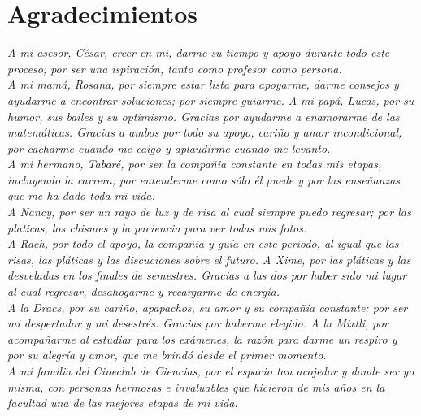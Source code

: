 \chapter*{Agradecimientos}


\textit{A mi asesor, C\'esar, creer en mi, darme su tiempo y apoyo durante todo
este proceso; por ser una ispiraci\'on, tanto como profesor como persona.}\\

\textit{A mi mam\'a, Rosana, por siempre estar lista para apoyarme, darme
consejos y ayudarme a encontrar soluciones;  por siempre guiarme. A mi pap\'a,
Lucas,  por su humor, sus bailes y su optimismo. Gracias por ayudarme a
enamorarme de las matem\'aticas. Gracias a ambos por todo su apoyo, cari\~{n}o y
amor incondicional; por cacharme cuando me caigo y
aplaudirme cuando me levanto.}\\

\textit{A mi hermano, Tabar\'e, por ser la compa\~{n}ia constante en todas mis
etapas, incluyendo la carrera; por entenderme como s\'olo \'el puede y por las
ense\~{n}anzas que me ha dado toda mi vida.}\\

\textit{A Nancy, por ser un rayo de luz y de risa al cual siempre puedo
regresar; por las platicas, los chismes y la paciencia para ver todas mis
fotos.}\\

\textit{A Rach, por todo el apoyo, la compa\~{n}ia y gu\'ia en este periodo, al
igual que las risas, las pl\'aticas y las discuciones sobre el futuro. A Xime,
por las pl\'aticas y las desveladas en los finales de semestres. Gracias a las
dos por haber sido mi lugar al cual regresar, desahogarme y recargarme de
energ\'ia.} \\

\textit{A la Dracs, por su cari\~{n}o, apapachos, su amor y su compa\~{n}\'ia
constante; por ser mi despertador y mi desestr\'es. Gracias por haberme
elegido. A la Mixtli, por acompa\~{n}arme al estudiar para los ex\'amenes, la
raz\'on para darme un respiro y por su alegr\'ia y amor, que me brind\'o desde
el primer momento.}\\ 

\textit{A mi familia del Cineclub de Ciencias, por el espacio tan acojedor  y
donde ser yo misma, con personas hermosas e invaluables que hicieron de mis
a\~{n}os en la facultad una de las mejores etapas de mi vida.}\\

